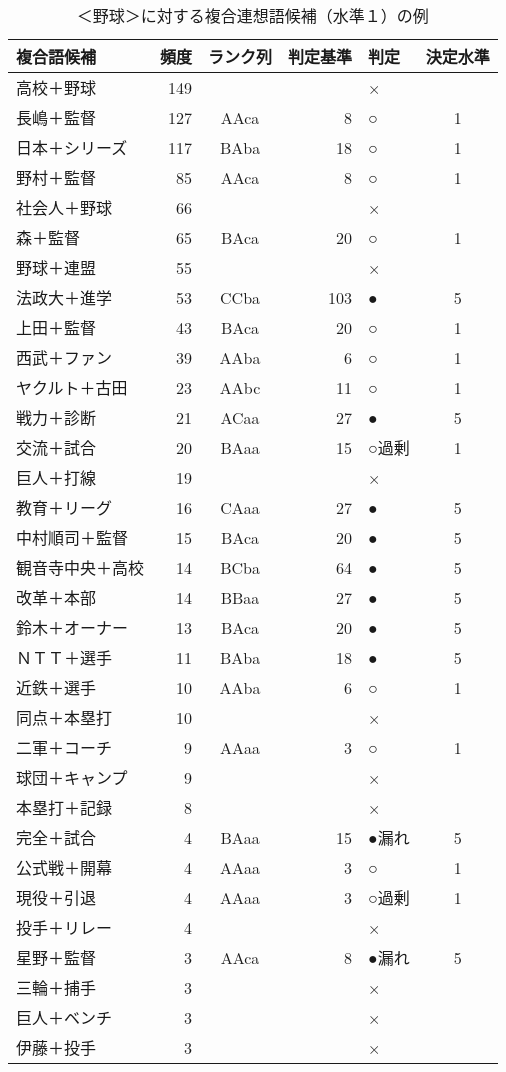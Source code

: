 \begin{table}[t]
 \caption{＜野球＞に対する複合連想語候補（水準１）の例}
 \begin{center}
  \begin{tabular}{lrcrlc}
    \hline\hline
複合語候補 & 頻度 & ランク列 & 判定基準 & 判定 & 決定水準 \\
    \hline
高校＋野球 & 149 &  &  & × &  \\
長嶋＋監督 & 127 & AAca & 8 & ○ & 1 \\
日本＋シリーズ & 117 & BAba & 18 & ○ & 1 \\
野村＋監督 & 85 & AAca & 8 & ○ & 1 \\
社会人＋野球 & 66 &  &  & × &  \\
森＋監督 & 65 & BAca & 20 & ○ & 1 \\
野球＋連盟 & 55 &  &  & × &  \\
法政大＋進学 & 53 & CCba & 103 & ● & 5 \\
上田＋監督 & 43 & BAca & 20 & ○ & 1 \\
西武＋ファン & 39 & AAba & 6 & ○ & 1 \\
ヤクルト＋古田 & 23 & AAbc & 11 & ○ & 1 \\
戦力＋診断 & 21 & ACaa & 27 & ● & 5 \\
交流＋試合 & 20 & BAaa & 15 & ○過剰 & 1 \\
巨人＋打線 & 19 &  &  & × &  \\
教育＋リーグ & 16 & CAaa & 27 & ● & 5 \\
中村順司＋監督 & 15 & BAca & 20 & ● & 5 \\
観音寺中央＋高校 & 14 & BCba & 64 & ● & 5 \\
改革＋本部 & 14 & BBaa & 27 & ● & 5 \\
鈴木＋オーナー & 13 & BAca & 20 & ● & 5 \\
ＮＴＴ＋選手 & 11 & BAba & 18 & ● & 5 \\
近鉄＋選手 & 10 & AAba & 6 & ○ & 1 \\
同点＋本塁打 & 10 &  &  & × &  \\
二軍＋コーチ & 9 & AAaa & 3 & ○ & 1 \\
球団＋キャンプ & 9 &  &  & × &  \\
本塁打＋記録 & 8 &  &  & × &  \\
完全＋試合 & 4 & BAaa & 15 & ●漏れ & 5 \\
公式戦＋開幕 & 4 & AAaa & 3 & ○ & 1 \\
現役＋引退 & 4 & AAaa & 3 & ○過剰 & 1 \\
投手＋リレー & 4 &  &  & × &  \\
星野＋監督 & 3 & AAca & 8 & ●漏れ & 5 \\
三輪＋捕手 & 3 &  &  & × &  \\
巨人＋ベンチ & 3 &  &  & × &  \\
伊藤＋投手 & 3 &  &  & × &  \\
    \hline
  \end{tabular}
 \end{center}
\end{table}

